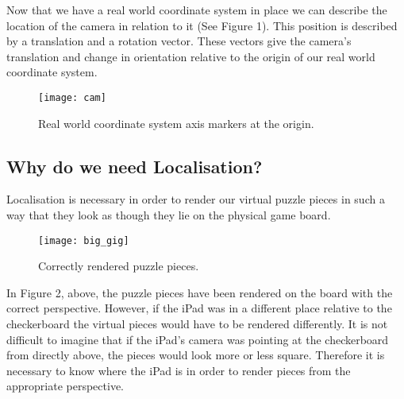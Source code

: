 \documentclass{article}
\begin{document}
Now that we have a real world coordinate system in place we can describe the location of the camera in relation to it (See Figure 1). This position is described by a translation and a rotation vector. These vectors give the camera's translation and change in orientation relative to the origin of our real world coordinate system.\par 


\begin{figure}[ht]
\begin{center}
\texttt{[image: cam]} 
\caption{Real world coordinate system axis markers at the origin.}
\end{center}
\end{figure}

\subsection {Why do we need Localisation?}

Localisation is necessary in order to render our virtual puzzle pieces in such a way that they look as though they lie on the physical game board. 
\vspace*{2\baselineskip}

\begin{figure}[H]
\begin{center}
\texttt{[image: big\_gig]} 
\caption{Correctly rendered puzzle pieces.}
\end{center}
\end{figure}

In Figure 2, above, the puzzle pieces have been rendered on the board with the correct perspective. However, if the iPad was in a different place relative to the checkerboard the virtual pieces would have to be rendered differently. It is not difficult to imagine that if the iPad's camera was pointing at the checkerboard from directly above, the pieces would look more or less square. Therefore it is necessary to know where the iPad is in order to render pieces from the appropriate perspective.
\end{document}
